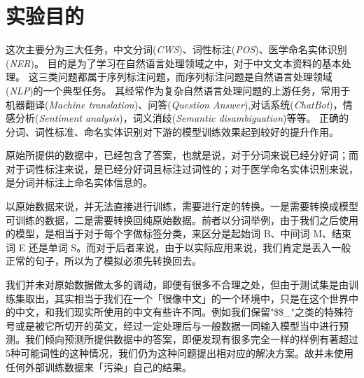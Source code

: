 \section{实验目的}
\label{sec:purpose}

这次主要分为三大任务，中文分词(\emph{CWS})、词性标注(\emph{POS})、医学命名实体识别(\emph{NER})。
目的是为了学习在自然语言处理领域之中，对于中文文本资料的基本处理。
这三类问题都属于序列标注问题，而序列标注问题是自然语言处理领域(\emph{NLP})的一个典型任务。
其经常作为复杂自然语言处理问题的上游任务，常用于机器翻译(\emph{Machine translation})、问答(\emph{Question Answer}),对话系统(\emph{ChatBot})，情感分析(\emph{Sentiment analysis})，词义消歧(\emph{Semantic disambiguation})等等。
正确的分词、词性标准、命名实体识别对下游的模型训练效果起到较好的提升作用。

原始所提供的数据中，已经包含了答案，也就是说，对于分词来说已经分好词；而对于词性标注来说，是已经分好词且标注过词性的；对于医学命名实体识别来说，是分词并标注上命名实体信息的。

以原始数据来说，并无法直接进行训练，需要进行定的转换。一是需要转换成模型可训练的数据，二是需要转换回纯原始数据。前者以分词举例，由于我们之后使用的模型，是相当于对于每个字做标签分类，来区分是起始词 B、中间词 M、结束词 E 还是单词 S。而对于后者来说，由于以实际应用来说，我们肯定是丢入一般正常的句子，所以为了模拟必须先转换回去。

我们并未对原始数据做太多的调动，即便有很多不合理之处，但由于测试集是由训练集取出，其实相当于我们在一个「很像中文」的一个环境中，只是在这个世界中的中文，和我们现实所使用的中文有些许不同。例如我们保留"\$\$\_"之类的特殊符号或是被它所切开的英文，经过一定处理后与一般数据一同输入模型当中进行预测。我们倾向预测所提供数据中的答案，即便发现有很多完全一样的样例有著超过5种可能词性的这种情况，我们仍为这种问题提出相对应的解决方案。故并未使用任何外部训练数据来「污染」自己的结果。
